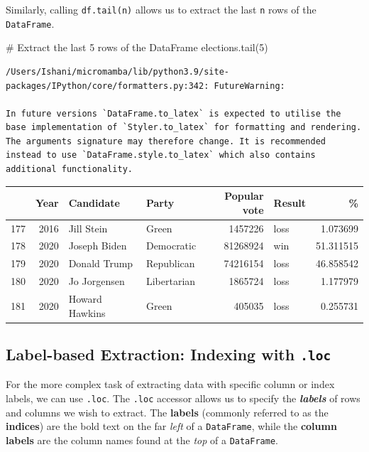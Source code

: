 \documentclass[
  letterpaper,
  DIV=11,
  numbers=noendperiod]{scrreprt}
\newenvironment{Shaded}{\begin{snugshade}}{\end{snugshade}}
\newcommand{\CommentTok}[1]{\textcolor[rgb]{0.37,0.37,0.37}{#1}}
\newcommand{\DecValTok}[1]{\textcolor[rgb]{0.68,0.00,0.00}{#1}}
\newcommand{\NormalTok}[1]{\textcolor[rgb]{0.00,0.23,0.31}{#1}}
\begin{document}
Similarly, calling \texttt{df.tail(n)} allows us to extract the last
\texttt{n} rows of the \texttt{DataFrame}.

\begin{Shaded}
\begin{Highlighting}[]
\CommentTok{\# Extract the last 5 rows of the DataFrame}
\NormalTok{elections.tail(}\DecValTok{5}\NormalTok{)}
\end{Highlighting}
\end{Shaded}

\begin{verbatim}
/Users/Ishani/micromamba/lib/python3.9/site-packages/IPython/core/formatters.py:342: FutureWarning:

In future versions `DataFrame.to_latex` is expected to utilise the base implementation of `Styler.to_latex` for formatting and rendering. The arguments signature may therefore change. It is recommended instead to use `DataFrame.style.to_latex` which also contains additional functionality.
\end{verbatim}

\begin{tabular}{lrllrlr}
\toprule
{} &  Year &       Candidate &        Party &  Popular vote & Result &          \% \\
\midrule
177 &  2016 &      Jill Stein &        Green &       1457226 &   loss &   1.073699 \\
178 &  2020 &    Joseph Biden &   Democratic &      81268924 &    win &  51.311515 \\
179 &  2020 &    Donald Trump &   Republican &      74216154 &   loss &  46.858542 \\
180 &  2020 &    Jo Jorgensen &  Libertarian &       1865724 &   loss &   1.177979 \\
181 &  2020 &  Howard Hawkins &        Green &        405035 &   loss &   0.255731 \\
\bottomrule
\end{tabular}

\hypertarget{label-based-extraction-indexing-with-.loc}{%
\subsection{\texorpdfstring{Label-based Extraction: Indexing with
\texttt{.loc}}{Label-based Extraction: Indexing with .loc}}\label{label-based-extraction-indexing-with-.loc}}

For the more complex task of extracting data with specific column or
index labels, we can use \texttt{.loc}. The \texttt{.loc} accessor
allows us to specify the \textbf{\emph{labels}} of rows and columns we
wish to extract. The \textbf{labels} (commonly referred to as the
\textbf{indices}) are the bold text on the far \emph{left} of a
\texttt{DataFrame}, while the \textbf{column labels} are the column
names found at the \emph{top} of a \texttt{DataFrame}.
\end{document}
